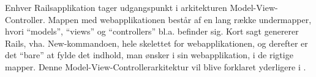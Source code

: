 Enhver Railsapplikation tager udgangspunkt i arkitekturen Model-View-Controller. Mappen med webapplikationen består af en lang række undermapper, hvori ``models'', ``views'' og ``controllers'' bl.a. befinder sig. Kort sagt genererer Rails, vha. New-kommandoen, hele skelettet for webapplikationen, og derefter er det ``bare'' at fylde det indhold, man ønsker i sin webapplikation, i de rigtige mapper. Denne Model-View-Controllerarkitektur vil blive forklaret yderligere i .

